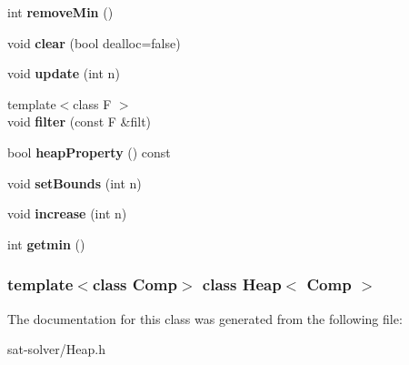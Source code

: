 \begin{DoxyCompactItemize}
\item 
\hypertarget{classHeap_a3b6378eebf64ba1fe99b139611ed2bbf}{int {\bfseries remove\-Min} ()}\label{classHeap_a3b6378eebf64ba1fe99b139611ed2bbf}

\item 
\hypertarget{classHeap_a3018b631f27fc84c7db692126e985e41}{void {\bfseries clear} (bool dealloc=false)}\label{classHeap_a3018b631f27fc84c7db692126e985e41}

\item 
\hypertarget{classHeap_a5819cfc5b50061d1e288881d3466f2ec}{void {\bfseries update} (int n)}\label{classHeap_a5819cfc5b50061d1e288881d3466f2ec}

\item 
\hypertarget{classHeap_ae0fad85e429c9eb0bf1d4e3d93d4fbbf}{{\footnotesize template$<$class F $>$ }\\void {\bfseries filter} (const \-F \&filt)}\label{classHeap_ae0fad85e429c9eb0bf1d4e3d93d4fbbf}

\item 
\hypertarget{classHeap_a2ecafb1795e9ea3fc9091db6884f2695}{bool {\bfseries heap\-Property} () const }\label{classHeap_a2ecafb1795e9ea3fc9091db6884f2695}

\item 
\hypertarget{classHeap_ab0e6f79043278fd47a609ccd864ef70c}{void {\bfseries set\-Bounds} (int n)}\label{classHeap_ab0e6f79043278fd47a609ccd864ef70c}

\item 
\hypertarget{classHeap_a8a82b5a31dc0ec7cb0cb729d4ac606b0}{void {\bfseries increase} (int n)}\label{classHeap_a8a82b5a31dc0ec7cb0cb729d4ac606b0}

\item 
\hypertarget{classHeap_a7e9f205407d038020f354eb67f09b7b4}{int {\bfseries getmin} ()}\label{classHeap_a7e9f205407d038020f354eb67f09b7b4}

\end{DoxyCompactItemize}
\subsubsection*{template$<$class \-Comp$>$ class Heap$<$ Comp $>$}



\-The documentation for this class was generated from the following file\-:\begin{DoxyCompactItemize}
\item 
sat-\/solver/\-Heap.\-h\end{DoxyCompactItemize}
